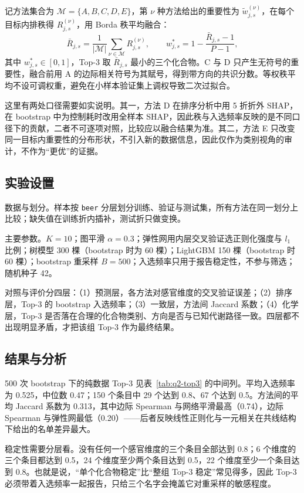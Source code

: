 ﻿\documentclass[UTF8,a4paper,zihao=-4]{ctexart}
\numberwithin{figure}{section}
\numberwithin{table}{section}
\numberwithin{equation}{section}
\newcommand{\file}[1]{\texttt{#1}}
\begin{document}
记方法集合为 $\mathcal{M}=\{A,B,C,D,E\}$，第 $\nu$ 种方法给出的重要性为 $\tilde w^{(\nu)}_{j,s}$，在每个目标内排秩得 $R^{(\nu)}_{j,s}$，用 Borda 秩平均融合：
\begin{equation}
\bar R_{j,s}=\frac{1}{|\mathcal{M}|}\sum_{\nu\in\mathcal{M}}R^{(\nu)}_{j,s},
\qquad
w^{*}_{j,s}=1-\frac{\bar R_{j,s}-1}{P-1},
\label{eq:borda}
\end{equation}
其中 $w^{*}_{j,s}\in[0,1]$，Top-3 取 $\bar R_{j,s}$ 最小的三个化合物。C 与 D 只产生无符号的重要性，融合前用 A 的边际相关符号为其赋号，得到带方向的共识分数。等权秩平均不设可调权重，避免在小样本验证集上调权导致二次过拟合。

这里有两处口径需要如实说明。其一，方法 D 在排序分析中用 5 折折外 SHAP，在 bootstrap 中为控制耗时改用全样本 SHAP，因此秩与入选频率反映的是不同口径下的贡献，二者不可逐项对照，比较应以融合结果为准。其二，方法 E 只改变同一目标内重要性的分布形状，不引入新的数据信息，因此仅作为类别视角的审计，不作为“更优”的证据。

\subsection{实验设置}

数据与划分。样本按 \file{beer} 分层划分训练、验证与测试集，所有方法在同一划分上比较；缺失值在训练折内插补，测试折只做变换。

主要参数。$K=10$；图平滑 $\alpha=0.3$；弹性网用内层交叉验证选正则化强度与 $l_1$ 比例；树模型 300 棵（bootstrap 时为 60 棵）；LightGBM 150 棵（bootstrap 时 60 棵）；bootstrap 重采样 $B=500$；入选频率只用于报告稳定性，不参与筛选；随机种子 42。

对照与评价分四层：（1）预测层，各方法对感官维度的交叉验证误差；（2）排序层，Top-3 的 bootstrap 入选频率；（3）一致层，方法间 Jaccard 系数；（4）化学层，Top-3 是否落在合理的化合物类别、方向是否与已知代谢路径一致。四层都不出现明显矛盾，才把该组 Top-3 作为最终结果。

\subsection{结果与分析}

500 次 bootstrap 下的纯数据 Top-3 见表~\ref{tab:q2-top3} 的中间列。平均入选频率为 0.525，中位数 0.47；150 个条目中 29 个达到 0.8、67 个达到 0.5。方法间的平均 Jaccard 系数为 0.313，其中边际 Spearman 与网络平滑最高（0.74），边际 Spearman 与弹性网最低（0.20）——后者反映线性正则化与一元相关在共线结构下给出的名单差异最大。

稳定性需要分层看。没有任何一个感官维度的三个条目全部达到 0.8；6 个维度的三个条目都达到 0.5，24 个维度至少两个条目达到 0.5，22 个维度至少一个条目达到 0.8。也就是说，“单个化合物稳定”比“整组 Top-3 稳定”常见得多，因此 Top-3 必须带着入选频率一起报告，只给三个名字会掩盖它对重采样的敏感程度。
\end{document}
